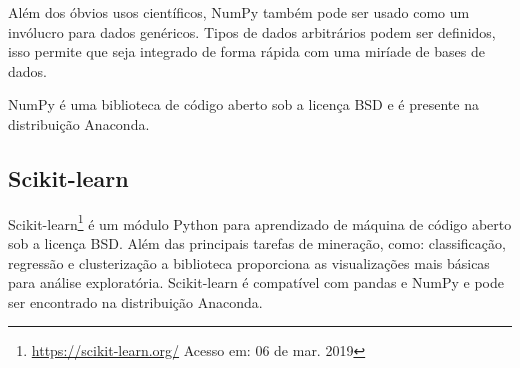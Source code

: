 Além dos óbvios usos científicos, NumPy também pode ser usado como um invólucro
para dados genéricos. Tipos de dados arbitrários podem ser definidos, isso
permite que  seja integrado de forma rápida com uma miríade de bases de dados.

NumPy é uma biblioteca de código aberto sob a licença BSD e é presente na
distribuição Anaconda.

\subsection{Scikit-learn}

Scikit-learn\footnote{\url{https://scikit-learn.org/} Acesso em: 06 de mar.
2019} é um módulo Python para aprendizado de máquina de código aberto sob a
licença BSD. Além das principais tarefas de mineração, como: classificação,
regressão e clusterização a biblioteca proporciona as visualizações mais básicas
para análise exploratória. Scikit-learn é compatível com pandas e NumPy e pode
ser encontrado na distribuição Anaconda.
